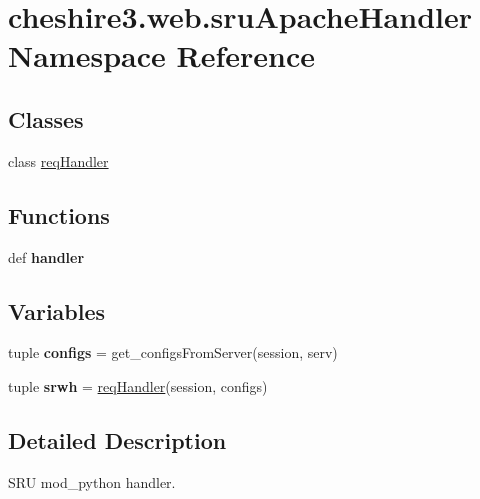 \hypertarget{namespacecheshire3_1_1web_1_1sru_apache_handler}{\section{cheshire3.\-web.\-sru\-Apache\-Handler Namespace Reference}
\label{namespacecheshire3_1_1web_1_1sru_apache_handler}
}
\subsection*{Classes}
\begin{DoxyCompactItemize}
\item 
class \hyperlink{classcheshire3_1_1web_1_1sru_apache_handler_1_1req_handler}{req\-Handler}
\end{DoxyCompactItemize}
\subsection*{Functions}
\begin{DoxyCompactItemize}
\item 
\hypertarget{namespacecheshire3_1_1web_1_1sru_apache_handler_acb557e4aa1ca4c48c7853b6f384c443e}{def {\bfseries handler}}\label{namespacecheshire3_1_1web_1_1sru_apache_handler_acb557e4aa1ca4c48c7853b6f384c443e}

\end{DoxyCompactItemize}
\subsection*{Variables}
\begin{DoxyCompactItemize}
\item 
\hypertarget{namespacecheshire3_1_1web_1_1sru_apache_handler_a62de0926043486b59226c03c8064f720}{tuple {\bfseries configs} = get\-\_\-configs\-From\-Server(session, serv)}\label{namespacecheshire3_1_1web_1_1sru_apache_handler_a62de0926043486b59226c03c8064f720}

\item 
\hypertarget{namespacecheshire3_1_1web_1_1sru_apache_handler_a131de6c7fdaa143d6ad8a3c509f372cd}{tuple {\bfseries srwh} = \hyperlink{classcheshire3_1_1web_1_1sru_apache_handler_1_1req_handler}{req\-Handler}(session, configs)}\label{namespacecheshire3_1_1web_1_1sru_apache_handler_a131de6c7fdaa143d6ad8a3c509f372cd}

\end{DoxyCompactItemize}


\subsection{Detailed Description}
\begin{DoxyVerb}SRU mod_python handler.\end{DoxyVerb}
 